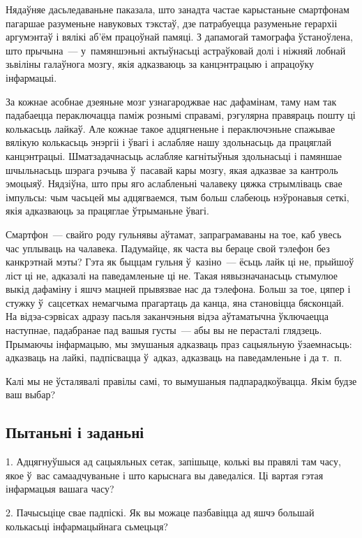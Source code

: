 Нядаўняе дасьледаваньне паказала, што занадта частае карыстаньне смартфонам пагаршае разуменьне навуковых тэкстаў, дзе патрабуецца разуменьне герархіі аргумэнтаў і вялікі аб'ём працоўнай памяці. З дапамогай тамографа ўстаноўлена, што прычына~--- у~памяншэньні актыўнасьці астраўковай долі і ніжняй лобнай зьвіліны галаўнога мозгу, якія адказваюць за канцэнтрацыю і апрацоўку інфармацыі.

За кожнае асобнае дзеяньне мозг узнагароджвае нас дафамінам, таму нам так падабаецца пераключацца паміж рознымі справамі, рэгулярна правяраць пошту ці колькасьць лайкаў. Але кожнае такое адцягненьне і пераключэньне спажывае вялікую колькасьць энэргіі і ўвагі і аслабляе нашу здольнасьць да працяглай канцэнтрацыі. Шматзадачнасьць аслабляе кагнітыўныя здольнасьці і памяншае шчыльнасьць шэрага рэчыва ў~пасавай кары мозгу, якая адказвае за кантроль эмоцыяў. Нядзіўна, што пры яго аслабленьні чалавеку цяжка стрымліваць свае імпульсы: чым часьцей мы адцягваемся, тым больш слабеюць нэўронавыя сеткі, якія адказваюць за працяглае ўтрыманьне ўвагі.

Смартфон~--- свайго роду гульнявы аўтамат, запраграмаваны на тое, каб увесь час уплываць на чалавека. Падумайце, як часта вы бераце свой тэлефон без канкрэтнай мэты? Гэта як быццам гульня ў~казіно~--- ёсьць лайк ці не, прыйшоў ліст ці не, адказалі на паведамленьне ці не. Такая нявызначанасьць стымулюе выкід дафаміну і яшчэ мацней прывязвае нас да тэлефона. Больш за тое, цяпер і стужку ў~сацсетках немагчыма прагартаць да канца, яна становіцца бясконцай. На відэа-сэрвісах адразу пасьля заканчэньня відэа аўтаматычна ўключаецца наступнае, падабранае пад вашыя густы~--- абы вы не перасталі глядзець. Прымаючы інфармацыю, мы змушаныя адказваць праз сацыяльную ўзаемнасьць: адказваць на лайкі, падпісвацца ў~адказ, адказваць на паведамленьне і да т.~п.

Калі мы не ўсталявалі правілы самі, то вымушаныя падпарадкоўвацца. Якім будзе ваш выбар?

\subsection*{Пытаньні і заданьні}

1. Адцягнуўшыся ад сацыяльных сетак, запішыце, колькі вы правялі там часу, якое ў~вас самаадчуваньне і што карыснага вы даведаліся. Ці вартая гэтая інфармацыя вашага часу?

2. Пачысьціце свае падпіскі. Як вы можаце пазбавіцца ад яшчэ большай колькасьці інфармацыйнага сьмецьця?

